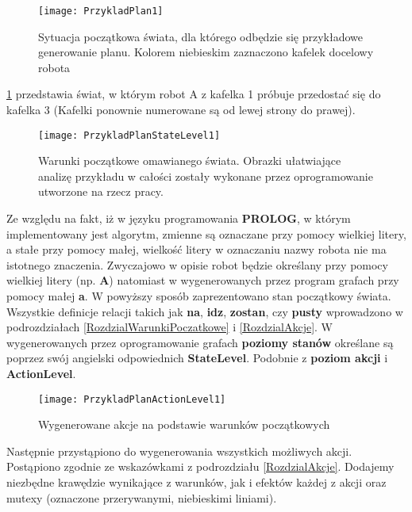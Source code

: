     \begin{figure}[H]
        \texttt{[image: PrzykladPlan1]}
        \centering
        \caption{Sytuacja początkowa świata, dla którego odbędzie się przykładowe generowanie planu. Kolorem niebieskim zaznaczono kafelek docelowy robota}
        \label{PrzykladPlan1}
    \end{figure}

    \ref{PrzykladPlan1} przedstawia świat, w którym robot A z kafelka 1 próbuje przedostać się do kafelka 3 (Kafelki ponownie numerowane są od lewej strony
    do prawej).

    \begin{figure}[H]
        \texttt{[image: PrzykladPlanStateLevel1]}
        \centering
        \caption{Warunki początkowe omawianego świata. Obrazki ułatwiające analizę przykładu w całości zostały 
        wykonane przez oprogramowanie utworzone na rzecz pracy. }
        \label{PrzykladPlanWP}
    \end{figure}

    Ze względu na fakt, iż w języku programowania \textbf{PROLOG}, w którym implementowany jest algorytm, zmienne są oznaczane przy pomocy wielkiej litery,
    a stałe przy pomocy małej, wielkość litery w oznaczaniu nazwy robota nie ma istotnego znaczenia. Zwyczajowo w opisie robot będzie określany 
    przy pomocy wielkiej litery (np. \textbf{A}) natomiast w wygenerowanych przez program grafach przy pomocy małej \textbf{a}.
    W powyższy sposób zaprezentowano stan początkowy świata. Wszystkie definicje relacji takich jak \textbf{na}, \textbf{idz}, \textbf{zostan}, czy 
    \textbf{pusty} wprowadzono w podrozdziałach \ref{RozdzialWarunkiPoczatkowe} i \ref{RozdzialAkcje}. W wygenerowanych przez oprogramowanie grafach \textbf{poziomy stanów}
    określane są poprzez swój angielski odpowiednich \textbf{StateLevel}. Podobnie z \textbf{poziom akcji} i \textbf{ActionLevel}. 

    \begin{figure}[H]
        \texttt{[image: PrzykladPlanActionLevel1]}
        \centering
        \caption{Wygenerowane akcje na podstawie warunków początkowych}
        \label{PrzykladPlanAP1}
    \end{figure}

    Następnie przystąpiono do wygenerowania wszystkich możliwych akcji. Postąpiono zgodnie ze wskazówkami z podrozdziału \ref{RozdzialAkcje}. 
    Dodajemy niezbędne krawędzie wynikające z warunków, jak i efektów każdej z akcji oraz mutexy (oznaczone przerywanymi, niebieskimi liniami).

